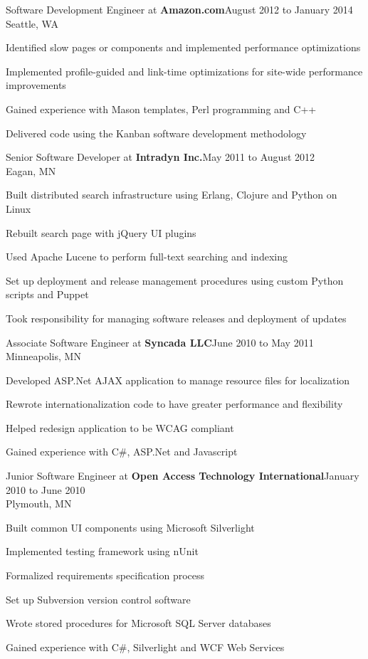 \documentclass[letterpaper]{article}
\newenvironment{resume-list}
{\begin{itemize}
 \setlength{\itemsep}{0pt}
 \setlength{\parskip}{0pt}}
{\end{itemize}}
\begin{document}
\pagebreak
\noindent Software Development Engineer at {\bfseries Amazon.com}\dotfill August 2012 to January 2014\\
Seattle, WA
\begin{resume-list}
\item Identified slow pages or components and implemented performance optimizations
\item Implemented profile-guided and link-time optimizations for site-wide performance improvements
\item Gained experience with Mason templates, Perl programming and C++
\item Delivered code using the Kanban software development methodology
\end{resume-list}
\noindent Senior Software Developer at {\bfseries Intradyn Inc.}\dotfill May 2011 to August 2012\\
Eagan, MN
\begin{resume-list}
\item Built distributed search infrastructure using Erlang, Clojure and Python on Linux
\item Rebuilt search page with jQuery UI plugins
\item Used Apache Lucene to perform full-text searching and indexing
\item Set up deployment and release management procedures using custom Python scripts and Puppet
\item Took responsibility for managing software releases and deployment of updates
\end{resume-list}
\noindent Associate Software Engineer at {\bfseries Syncada LLC}\dotfill June 2010 to May 2011\\
Minneapolis, MN
\begin{resume-list}
\item Developed ASP.Net AJAX application to manage resource files for localization
\item Rewrote internationalization code to have greater performance and flexibility
\item Helped redesign application to be WCAG compliant
\item Gained experience with C\#, ASP.Net and Javascript
\end{resume-list}
\noindent Junior Software Engineer at {\bfseries Open Access Technology International}\dotfill January 2010 to June 2010\\
Plymouth, MN
\begin{resume-list}
\item Built common UI components using Microsoft Silverlight
\item Implemented testing framework using nUnit
\item Formalized requirements specification process
\item Set up Subversion version control software
\item Wrote stored procedures for Microsoft SQL Server databases
\item Gained experience with C\#, Silverlight and WCF Web Services
\end{resume-list}
\end{document}
